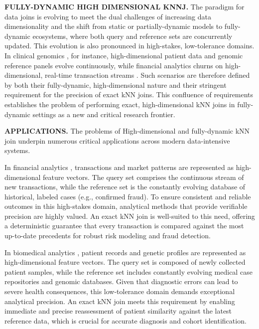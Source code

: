 \noindent \textbf{FULLY-DYNAMIC HIGH DIMENSIONAL KNNJ.} The paradigm for data joins is evolving to meet the dual challenges of increasing data dimensionality and the shift from static or partially-dynamic models to fully-dynamic ecosystems, where both query and reference sets are concurrently updated. This evolution is also pronounced in high-stakes, low-tolerance domains. In clinical genomics \cite{mukherjee2023iot, reddy2022novel, bharadwaj2021review}, for instance, high-dimensional patient data and genomic reference panels evolve continuously, while financial analytics churns on high-dimensional, real-time transaction streams \cite{lin2021multidimensional, li2023artificial, gao2024machine}. Such scenarios are therefore defined by both their fully-dynamic, high-dimensional nature and their stringent requirement for the precision of exact kNN joins. This confluence of requirements establishes the problem of performing exact, high-dimensional kNN joins in fully-dynamic settings as a new and critical research frontier.

\noindent\textbf{APPLICATIONS.} The problems of High-dimensional and fully-dynamic kNN join underpin numerous critical applications across modern data-intensive systems.

In financial analytics \cite{rao2024hybrid, lin2021multidimensional, pillai2024financial, li2023artificial, gao2024machine}, transactions and market patterns are represented as high-dimensional feature vectors. The query set comprises the continuous stream of new transactions, while the reference set is the constantly evolving database of historical, labeled cases (e.g., confirmed fraud). To ensure consistent and reliable outcomes in this high-stakes domain, analytical methods that provide verifiable precision are highly valued. An exact kNN join is well-suited to this need, offering a deterministic guarantee that every transaction is compared against the most up-to-date precedents for robust risk modeling and fraud detection.

In biomedical analytics \cite{reddy2022novel, mukherjee2023iot, al2025dynamic, bharadwaj2021review}, patient records and genetic profiles are represented as high-dimensional feature vectors. The query set is composed of newly collected patient samples, while the reference set includes constantly evolving medical case repositories and genomic databases. Given that diagnostic errors can lead to severe health consequences, this low-tolerance domain demands exceptional analytical precision. An exact kNN join meets this requirement by enabling immediate and precise reassessment of patient similarity against the latest reference data, which is crucial for accurate diagnosis and cohort identification.


